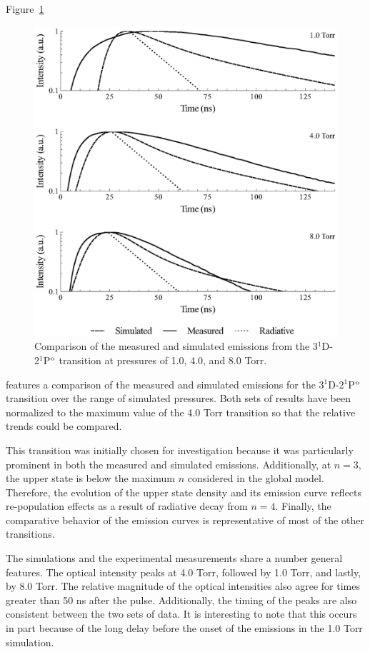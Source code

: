 Figure~\ref{fig:667comp}
\begin{figure}
  \centering
  \includegraphics{./chapters/emissions/figures/667comp.eps}
  \caption{Comparison of the measured and simulated emissions from the
  3$^1$D-2$^1$P$^\mathrm{o}$ transition at pressures of 1.0, 4.0, and 8.0 Torr.}
  \label{fig:667comp}
\end{figure}
features a comparison of the measured and simulated emissions for the
3$^1$D-2$^1$P$^\mathrm{o}$ transition over the range of simulated pressures. Both sets
of results have been normalized to the maximum value of the 4.0 Torr transition
so that the relative trends could be compared. 

This transition was initially chosen for investigation because it was
particularly prominent in both the measured and simulated emissions.
Additionally, at $n=3$, the upper state is below the maximum $n$ considered in
the global model. Therefore, the evolution of the upper state density and its
emission curve reflects re-population effects as a result of radiative decay
from $n=4$. Finally, the comparative behavior of the emission curves is
representative of most of the other transitions.

The simulations and the experimental measurements share a number general
features. The optical intensity peaks at 4.0 Torr, followed by 1.0 Torr, and
lastly, by 8.0 Torr. The relative magnitude of the optical intensities also
agree for times greater than 50 ns after the pulse. Additionally, the timing of
the peaks are also consistent between the two sets of data. It is interesting to
note that this occurs in part because of the long delay before the onset of the
emissions in the 1.0 Torr simulation.

